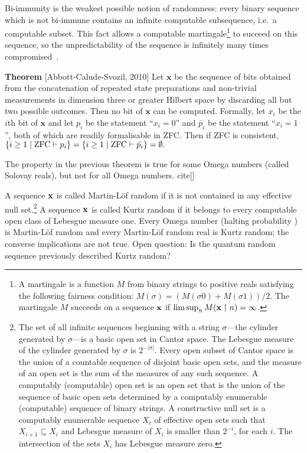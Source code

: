 \documentclass[preprint,11pt]{elsarticle}
\def \u {\upharpoonright}
\begin{document}
Bi-immunity is the weakest possible notion of randomness: every binary sequence which is not bi-immune contains an infinite computable subsequence, i.e.\ a computable subset. This fact allows a computable martingale\footnote{A martingale is a function $M$  from binary strings to positive reals satisfying the following fairness condition: $M(\sigma) = (M(\sigma 0) + M(\sigma 1))/2$. The martingale $M$ succeeds on a sequence ${\bf x}$   if $\limsup_{n} M({\bf x}\u n) =\infty$.}
 to succeed on this sequence, so the unpredictability of the sequence
is infinitely many times compromised~\cite{Kjos-Hanssen:2010kx}.



\medskip


{\bf Theorem} [Abbott-Calude-Svozil, 2010] Let ${\mathbf x}$ be the sequence of bits obtained from the concatenation of repeated state preparations and non-trivial measurements in dimension three or greater Hilbert space by discarding all but two possible outcomes.
Then no bit of  ${\mathbf x}$ can be computed. Formally, let $x_{i}$ be the $i$th bit of ${\mathbf x}$ and let $p_i$ be the statement ``$x_i=0$'' and $\bar{p}_i$ be the statement ``$x_i=1$'', both of which are readily formalisable in ZFC.
Then if ZFC is consistent, $\{ i \ge 1 \mid {\rm ZFC} \vdash p_i \} = \{ i \ge 1 \mid {\rm ZFC} \vdash \bar{p_i} \} = \emptyset.$



The property in the previous theorem is true for some Omega numbers (called Solovay reals), but not for all Omega numbers. cite[]
\fi

A sequence ${\bf x}$ is called Martin-L\"of  random if it is not contained in any effective null set.\footnote{The set of all infinite sequences beginning with a string $\sigma$---the cylinder generated by $\sigma$---is a basic open set in Cantor space. The Lebesgue measure of the cylinder generated by $\sigma$ is  $2^{-|\sigma|}$. Every open subset of Cantor space is the union of a countable sequence of disjoint basic open sets, and the measure of an open set is the sum of the measures of any such sequence. A computably (computable) open set is an open set that is the union of the sequence of basic open sets determined by a computably enumerable (computable) sequence of binary strings. A constructive null  set is a computably enumerable sequence $X_{i}$ of effective open sets such that  $X_{i+1} \subseteq X_{i}$ and Lebesgue measure of $X_{i}$ is smaller than $2^{-i}$, for each $ i$.  The intersection of the sets $X_{i}$  has Lebesgue measure zero.}
A sequence ${\bf x}$ is called Kurtz random if it belongs to every computable open class of Lebesgue measure one.
Every Omega number (halting probability \cite{Calude:2008aa}) is Martin-L\"of  random and every Martin-L\"of  random real is Kurtz random; the converse implications are not true. Open question: Is the quantum random sequence previously described Kurtz random?
\end{document}
